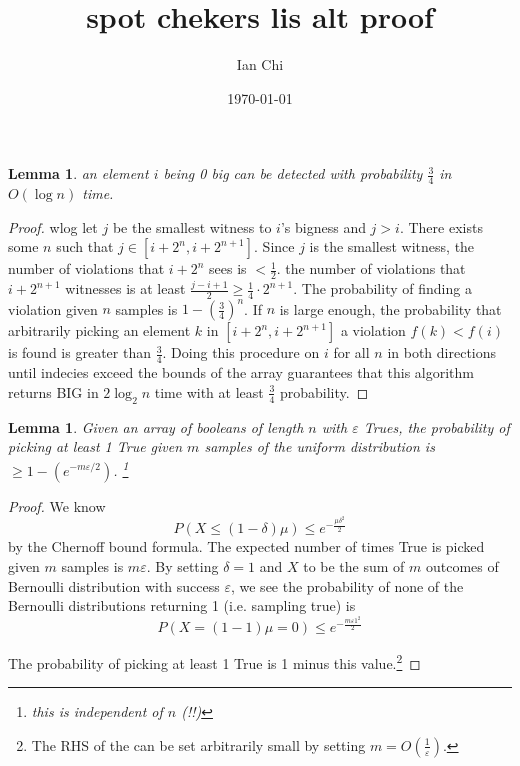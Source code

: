 \documentclass{article}
\title{spot chekers lis alt proof}
\author{Ian Chi}
\date{\today}
\newtheorem{lemma}[theorem]{Lemma}
\begin{document}
\maketitle

\begin{lemma}\label{0big}
    an element \(i\) being 0 big can be detected with probability \(\frac{3}{4}\) in \(O(\log n)\) time.
\end{lemma}

\begin{proof}
    wlog let \(j\) be the smallest witness to \(i\)'s bigness and \(j>i\). There exists some \(n\) such that \(j\in [i+2^n,i+2^{n+1}]\). Since \(j\) is the smallest witness, the number of violations that \(i+2^n\) sees is \(<\frac{1}{2}\). the number of violations that \(i+2^{n+1}\) witnesses is at least \(\frac{j-i+1}{2}\geq \frac{1}{4}\cdot 2^{n+1}\). The probability of finding a violation given \(n\) samples is \(1-\left( \frac{3}{4} \right)^n\). If \(n\) is large enough, the probability that arbitrarily picking an element \(k\) in \([i+2^n,i+2^{n+1}]\) a violation \(f(k)<f(i)\) is found is greater than \(\frac{3}{4}\). Doing this procedure on \(i\) for all \(n\) in both directions until indecies exceed the bounds of the array guarantees that this algorithm returns BIG in \(2 \log_2 n\) time with at least \(\frac{3}{4}\) probability. 
\end{proof}

\begin{lemma}
    Given an array of booleans of length \(n\) with \(\varepsilon\) Trues, the probability of picking at least 1 True given \(m\) samples of the uniform distribution is \(\geq 1-(e^{-m \varepsilon/2})\). \footnote{this is independent of \(n\) (!!)}
\end{lemma}

\begin{proof}
    We know \begin{equation}
        P(X \le (1-\delta)\mu) \le e^{-\frac{\mu\delta^2}{2}}
    \end{equation} by the Chernoff bound formula.
    The expected number of times True is picked given \(m\) samples is \(m \varepsilon\). By setting \(\delta=1\) and \(X\) to be the sum of \(m\) outcomes of Bernoulli distribution with success \(\varepsilon\), we see the probability of none of the Bernoulli distributions returning 1 (i.e. sampling true) is \begin{equation}
        P(X = (1-1)\mu=0) \le e^{-\frac{m\varepsilon 1^2}{2}}
    \end{equation}

    The probability of picking at least 1 True is 1 minus this value.\footnote{The RHS of the can be set arbitrarily small by setting \(m=O\left( \frac{1}{\varepsilon}  \right) \). }

    
\end{proof}
\end{document}

